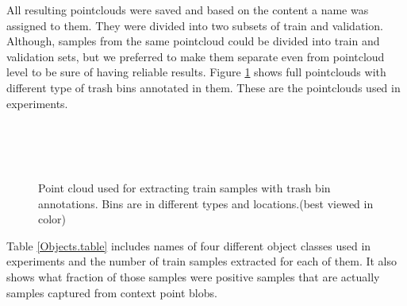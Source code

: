 
All resulting pointclouds were saved and based on the content a name was assigned to them. 
They were divided into two subsets of train and validation. 
Although, samples from the same pointcloud could be divided into train and validation sets, but we preferred to make them separate 
even from pointcloud level to be sure of having reliable results. 
Figure \ref{TrainClouds1.figure:edge} shows full pointclouds with different type of trash bins annotated in them. 
These are the pointclouds used in experiments.


\begin{figure} [htp]
   \begin{center}
     \\
     \\
     \\
  \end{center}
  \caption[Train set pointclouds]
  {Point cloud used for extracting train samples with trash bin annotations. Bins are in different types and locations.(best viewed in color)}
  \label{TrainClouds1.figure:edge}
\end{figure}

Table \ref{Objects.table} includes names of four different object classes used in experiments and the number of train samples extracted for each of them.
It also shows what fraction of those samples were positive samples that are actually samples captured from context point blobs.


